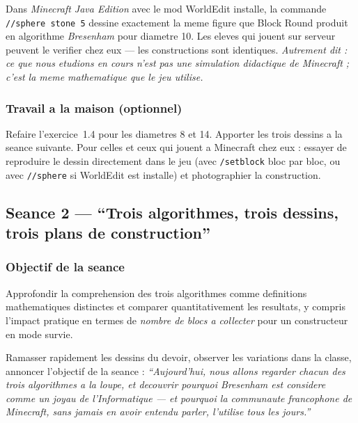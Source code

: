 \documentclass[12pt,a4paper]{scrartcl}
\newcommand{\cmd}[1]{\textcolor{earth}{\texttt{\small #1}}}
\newcommand{\tempo}[1]{\textnormal{\footnotesize\color{bg!90!white}\textsf{#1}}}
\begin{document}
\begin{minecraft}
Dans \emph{Minecraft Java Edition} avec le mod WorldEdit installe, la commande \cmd{//sphere stone 5} dessine exactement la meme figure que Block Round produit en algorithme \emph{Bresenham} pour diametre 10. Les eleves qui jouent sur serveur peuvent le verifier chez eux --- les constructions sont identiques. \emph{Autrement dit : ce que nous etudions en cours n'est pas une simulation didactique de Minecraft ; c'est la meme mathematique que le jeu utilise.}
\end{minecraft}

\subsubsection*{Travail a la maison (optionnel)}
Refaire l'exercice~1.4 pour les diametres 8 et 14. Apporter les trois dessins a la seance suivante. Pour celles et ceux qui jouent a Minecraft chez eux : essayer de reproduire le dessin directement dans le jeu (avec \cmd{/setblock} bloc par bloc, ou avec \cmd{//sphere} si WorldEdit est installe) et photographier la construction.

\subsection{Seance 2 --- \enquote{Trois algorithmes, trois dessins, trois plans de construction}}\label{aula2}

\subsubsection*{Objectif de la seance}
Approfondir la comprehension des trois algorithmes comme definitions mathematiques distinctes et comparer quantitativement les resultats, y compris l'impact pratique en termes de \emph{nombre de blocs a collecter} pour un constructeur en mode survie.

\begin{activite}[2.1 --- Reprise \quad\tempo{5 min}]
Ramasser rapidement les dessins du devoir, observer les variations dans la classe, annoncer l'objectif de la seance : \emph{\enquote{Aujourd'hui, nous allons regarder chacun des trois algorithmes a la loupe, et decouvrir pourquoi Bresenham est considere comme un joyau de l'Informatique --- et pourquoi la communaute francophone de Minecraft, sans jamais en avoir entendu parler, l'utilise tous les jours.}}
\end{activite}
\end{document}
